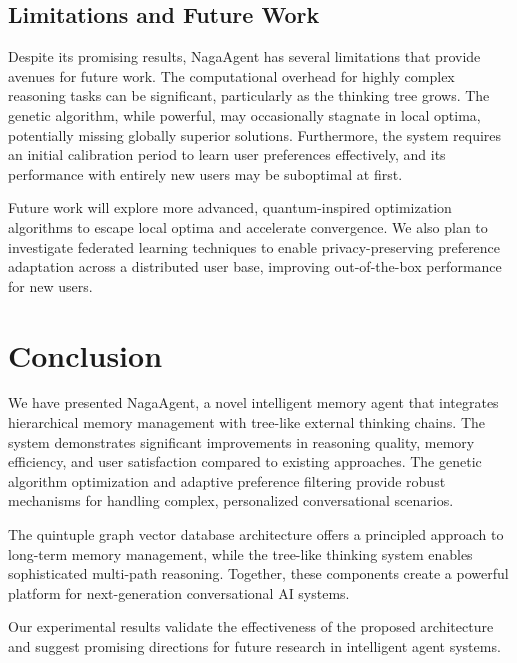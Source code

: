 \documentclass[letterpaper]{article} %
\begin{document}
\subsection{Limitations and Future Work}

Despite its promising results, NagaAgent has several limitations that provide avenues for future work. The computational overhead for highly complex reasoning tasks can be significant, particularly as the thinking tree grows. The genetic algorithm, while powerful, may occasionally stagnate in local optima, potentially missing globally superior solutions. Furthermore, the system requires an initial calibration period to learn user preferences effectively, and its performance with entirely new users may be suboptimal at first.

Future work will explore more advanced, quantum-inspired optimization algorithms to escape local optima and accelerate convergence. We also plan to investigate federated learning techniques to enable privacy-preserving preference adaptation across a distributed user base, improving out-of-the-box performance for new users.

\section{Conclusion}

We have presented NagaAgent, a novel intelligent memory agent that integrates hierarchical memory management with tree-like external thinking chains. The system demonstrates significant improvements in reasoning quality, memory efficiency, and user satisfaction compared to existing approaches. The genetic algorithm optimization and adaptive preference filtering provide robust mechanisms for handling complex, personalized conversational scenarios.

The quintuple graph vector database architecture offers a principled approach to long-term memory management, while the tree-like thinking system enables sophisticated multi-path reasoning. Together, these components create a powerful platform for next-generation conversational AI systems.

Our experimental results validate the effectiveness of the proposed architecture and suggest promising directions for future research in intelligent agent systems.


\end{document}
